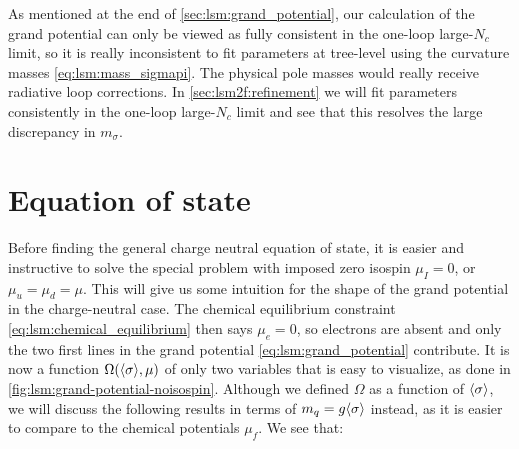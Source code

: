As mentioned at the end of \cref{sec:lsm:grand_potential},
our calculation of the grand potential can only be viewed as fully consistent in the one-loop large-$N_c$ limit,
so it is really inconsistent to fit parameters at tree-level using the curvature masses \eqref{eq:lsm:mass_sigmapi}.
The physical pole masses would really receive radiative loop corrections.
In \cref{sec:lsm2f:refinement} we will fit parameters consistently in the one-loop large-$N_c$ limit
and see that this resolves the large discrepancy in $m_\sigma$.

\pagebreak
\section{Equation of state}

Before finding the general charge neutral equation of state,
it is easier and instructive to solve the special problem with imposed zero isospin $\mu_I=0$, or $\mu_u=\mu_d=\mu$.
This will give us some intuition for the shape of the grand potential in the charge-neutral case.
The chemical equilibrium constraint \eqref{eq:lsm:chemical_equilibrium} then says $\mu_e=0$,
so electrons are absent and only the two first lines in the grand potential \eqref{eq:lsm:grand_potential} contribute.
It is now a function $\Omega(\langle \sigma \rangle,\mu)$ of only two variables that is easy to visualize, as done in \cref{fig:lsm:grand-potential-noisospin}.
Although we defined $\Omega$ as a function of $\langle \sigma \rangle$, we will discuss the following results in terms of $m_q = g \langle \sigma \rangle$ instead,
as it is easier to compare to the chemical potentials $\mu_f$.
We see that:

